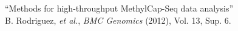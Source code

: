 ``Methods for high-throughput MethylCap-Seq data analysis'' \\
\small{B. Rodriguez, \textit{et al.}, \textit{BMC Genomics} (2012), Vol. 13, Sup. 6.} \\
